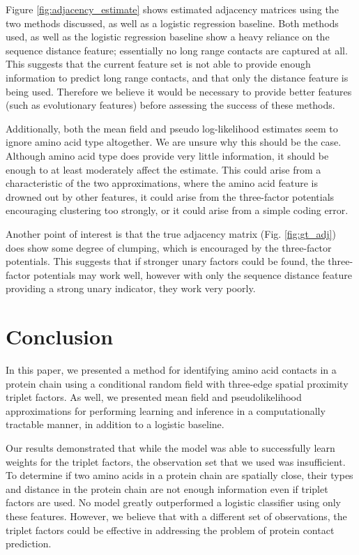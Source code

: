 \documentclass{article}
\begin{document}
Figure \ref{fig:adjacency_estimate} shows estimated adjacency matrices using the two methods discussed, as well as a logistic regression baseline. Both methods used, as well as the logistic regression baseline show a heavy reliance on the sequence distance feature; essentially no long range contacts are captured at all. This suggests that the current feature set is not able to provide enough information to predict long range contacts, and that only the distance feature is being used. Therefore we believe it would be necessary to provide better features (such as evolutionary features) before assessing the success of these methods.

Additionally, both the mean field and pseudo log-likelihood estimates seem to ignore amino acid type altogether. We are unsure why this should be the case. Although amino acid type does provide very little information, it should be enough to at least moderately affect the estimate. This could arise from a characteristic of the two approximations, where the amino acid feature is drowned out by other features, it could arise from the three-factor potentials encouraging clustering too strongly, or it could arise from a simple coding error.

Another point of interest is that the true adjacency matrix (Fig. \ref{fig:gt_adj}) does show some degree of clumping, which is encouraged by the three-factor potentials. This suggests that if stronger unary factors could be found, the three-factor potentials may work well, however with only the sequence distance feature providing a strong unary indicator, they work very poorly.

\section{Conclusion}

In this paper, we presented a method for identifying amino acid contacts in a protein chain using a conditional random field with three-edge spatial proximity triplet factors. As well, we presented mean field and pseudolikelihood approximations for performing learning and inference in a computationally tractable manner, in addition to a logistic baseline. 

Our results demonstrated that while the model was able to successfully learn weights for the triplet factors, the observation set that we used was insufficient. To determine if two amino acids in a protein chain are spatially close, their types and distance in the protein chain are not enough information even if triplet factors are used. No model greatly outperformed a logistic classifier using only these features. However, we believe that with a different set of observations, the triplet factors could be effective in addressing the problem of protein contact prediction.
\end{document}
